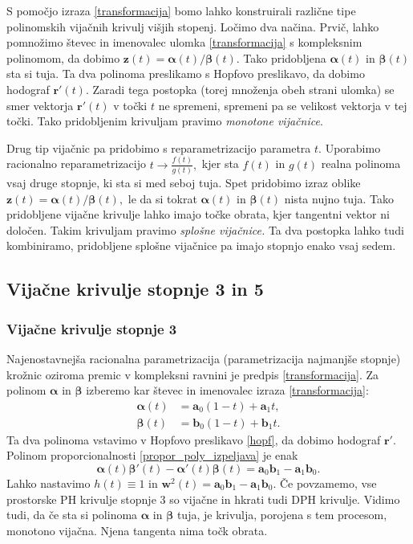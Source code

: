 \documentclass[12pt,a4paper,twoside]{article}
\theoremstyle{definition} %
\theoremstyle{plain} %
\theoremstyle{primerstyle}
\numberwithin{equation}{section}  %
\newcommand{\aV}{\mathbf{a}}
\newcommand{\bV}{\mathbf{b}}
\newcommand{\rV}{\mathbf{r}}
\newcommand{\wV}{\mathbf{w}}
\newcommand{\zV}{\mathbf{z}}
\newcommand{\balpha}{\boldsymbol \alpha}
\newcommand{\bbeta}{\boldsymbol \beta}
\begin{document}
S pomočjo izraza \eqref{transformacija} bomo lahko konstruirali različne tipe polinomskih vijačnih krivulj višjih stopenj. Ločimo dva načina. Prvič, lahko pomnožimo števec in imenovalec ulomka \eqref{transformacija} s kompleksnim polinomom, da dobimo $\zV(t)=\balpha(t)/\bbeta(t).$ Tako pridobljena $\balpha(t)$ in $\bbeta(t)$ sta si tuja. Ta dva polinoma preslikamo s Hopfovo preslikavo, da dobimo hodograf $\rV'(t).$ Zaradi tega postopka (torej množenja obeh strani ulomka) se smer vektorja $\rV'(t)$ v točki $t$ ne spremeni, spremeni pa se velikost vektorja v tej točki. Tako pridobljenim krivuljam pravimo \emph{monotone vijačnice}.

Drug tip vijačnic pa pridobimo s reparametrizacijo parametra $t.$ Uporabimo racionalno reparametrizacijo $t\to\frac{f(t)}{g(t)},$ kjer sta $f(t)$ in $g(t)$ realna polinoma vsaj druge stopnje, ki sta si med seboj tuja. Spet pridobimo izraz oblike $\zV(t)=\balpha(t)/\bbeta(t),$ le da si tokrat $\balpha(t)$ in $\bbeta(t)$ nista nujno tuja. Tako pridobljene vijačne krivulje lahko imajo točke obrata, kjer tangentni vektor ni določen. Takim krivuljam pravimo \emph{splošne vijačnice.} Ta dva postopka lahko tudi kombiniramo, pridobljene splošne vijačnice pa imajo stopnjo enako vsaj sedem.

\subsection{Vijačne krivulje stopnje 3 in 5}

\subsubsection{Vijačne krivulje stopnje 3}

Najenostavnejša racionalna parametrizacija (parametrizacija najmanjše stopnje)\\krožnic oziroma premic v kompleksni ravnini je predpis \eqref{transformacija}. Za polinom $\balpha$ in $\bbeta$ izberemo kar števec in imenovalec izraza \eqref{transformacija}:
\begin{align*}
	\balpha(t)&=\aV_0(1-t)+\aV_1t,\\
	\bbeta(t)&=\bV_0(1-t)+\bV_1t.
\end{align*}
Ta dva polinoma vstavimo v Hopfovo preslikavo \eqref{hopf}, da dobimo hodograf $\rV'.$ Polinom proporcionalnosti \eqref{propor_poly_izpeljava} je enak
\begin{equation*}
	\balpha(t)\bbeta'(t)-\balpha'(t)\bbeta(t)=\aV_0\bV_1-\aV_1\bV_0.
\end{equation*}
Lahko nastavimo $h(t)\equiv1$ in $\wV^2(t)=\aV_0\bV_1-\aV_1\bV_0.$ Če povzamemo, vse prostorske PH krivulje stopnje 3 so vijačne in hkrati tudi DPH krivulje. Vidimo tudi, da če sta si polinoma $\balpha$ in $\bbeta$ tuja, je krivulja, porojena s tem procesom, monotono vijačna. Njena tangenta nima točk obrata.
\end{document}
